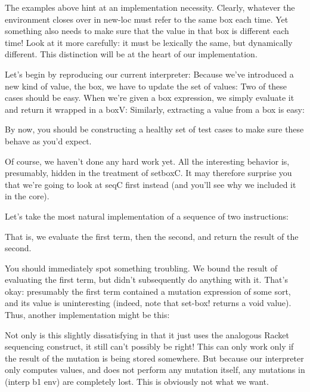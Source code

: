 The examples above hint at an implementation necessity. Clearly, whatever the
environment closes over in new-loc must refer to the same box each time. Yet
something also needs to make sure that the value in that box is different each
time! Look at it more carefully: it must be lexically the same, but dynamically
different. This distinction will be at the heart of our implementation.


Let’s begin by reproducing our current interpreter:
Because we’ve introduced a new kind of value, the box, we have to update the set
of values:
Two of these cases should be easy. When we’re given a box expression, we simply
evaluate it and return it wrapped in a boxV:
Similarly, extracting a value from a box is easy:

By now, you should be constructing a healthy set of test cases to make sure
these behave as you’d expect.

Of course, we haven’t done any hard work yet. All the interesting behavior is,
presumably, hidden in the treatment of setboxC. It may therefore surprise you
that we’re going to look at seqC first instead (and you’ll see why we included
it in the core).

Let’s take the most natural implementation of a sequence of two instructions:

That is, we evaluate the first term, then the second, and return the result of
the second.

You should immediately spot something troubling. We bound the result of
evaluating the first term, but didn’t subsequently do anything with it. That’s
okay: presumably the first term contained a mutation expression of some sort,
and its value is uninteresting (indeed, note that set-box! returns a void
value). Thus, another implementation might be this:

Not only is this slightly dissatisfying in that it just uses the analogous
Racket sequencing construct, it still can’t possibly be right! This can only
work only if the result of the mutation is being stored somewhere. But because
our interpreter only computes values, and does not perform any mutation itself,
any mutations in (interp b1 env) are completely lost. This is obviously not what
we want.

\secup
